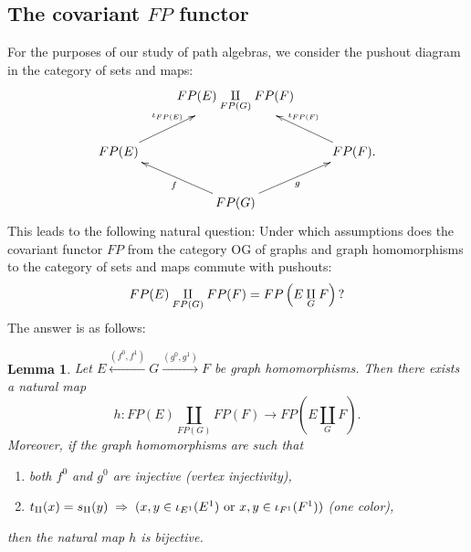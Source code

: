 \documentclass[12pt,times,a4paper]{amsart}
\newtheorem{lemma}[theorem]{Lemma}
\numberwithin{equation}{section}
\def\text{\hbox}
\numberwithin{equation}{section}
\begin{document}
\subsection{The covariant \boldmath$FP$ functor}
For the purposes of our study of path algebras, we consider the pushout diagram in the category of sets and maps:
\begin{equation}
\xymatrix{
&
FP(E)\underset{FP(G)}{\amalg}FP(F)
&\\
FP(E)
\ar[ur]^{\iota_{FP(E)}}& & 
FP(F).
\ar[ul]_{\iota_{FP(F)}}\\
&
FP(G)
\ar[ur]_{g}\ar[ul]^{f}&
}
\end{equation}
This leads to the following natural question: 
Under which assumptions does the covariant functor $FP$ from the category $\mathrm{OG}$
of graphs and graph homomorphisms to the category of sets and maps commute with pushouts:
\begin{equation}
FP(E)\underset{FP(G)}{\amalg}FP(F)=FP\left(E\underset{G}{\amalg}F\right)\text{?}
\end{equation}
The answer is as follows:
\begin{lemma}\label{answer}
Let $E\stackrel{(f^0,f^1)}{\longleftarrow} G\stackrel{(g^0,g^1)}{\longrightarrow} F$ 
be graph homomorphisms.
Then there exists a natural map
\begin{equation*}
h\colon FP(E)\underset{FP(G)}{\amalg}FP(F)\longrightarrow FP\left(E\underset{G}{\amalg}F\right).
\end{equation*}
Moreover,  if the graph homomorphisms are such that
\vspace*{-2mm}
\begin{enumerate}
\item
both $f^0$ and $g^0$ are injective (vertex injectivity),
\item
$t_\amalg(x)=s_\amalg(y)\;\Rightarrow\;(x,y\in\iota_{E^1}(E^1)\text{ or }x,y\in\iota_{F^1}(F^1))$
(one color),
\end{enumerate}
then the natural map $h$ is bijective.
\end{lemma}
\end{document}
